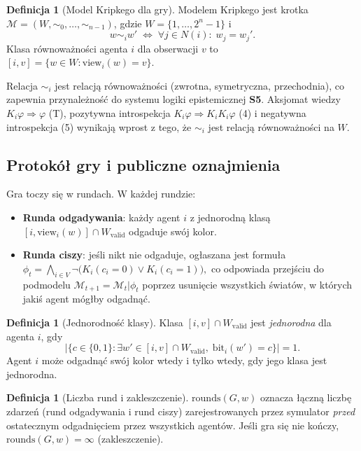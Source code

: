 \documentclass[12pt,a4paper]{article}
\theoremstyle{plain}
\theoremstyle{definition}
\newtheorem{definition}[theorem]{Definicja}
\theoremstyle{remark}
\newcommand{\rounds}{\mathrm{rounds}}
\newcommand{\view}{\mathrm{view}}
\newcommand{\Wval}{W_{\mathrm{valid}}}
\begin{document}
\begin{definition}[Model Kripkego dla gry]
Modelem Kripkego jest krotka $\mathcal{M} = (W, \sim_0, \ldots, \sim_{n-1})$, gdzie $W = \{1,\ldots,2^n{-}1\}$ i
$$w \sim_i w' \;\iff\; \forall j \in N(i):\; w_j = w_j'.$$
Klasa równoważności agenta $i$ dla obserwacji $v$ to $[i,v] = \{w \in W : \view_i(w) = v\}$.
\end{definition}

Relacja $\sim_i$ jest relacją równoważności (zwrotna, symetryczna, przechodnia), co zapewnia przynależność do systemu logiki epistemicznej \textbf{S5}. Aksjomat wiedzy $K_i\varphi \Rightarrow \varphi$ (T), pozytywna introspekcja $K_i\varphi \Rightarrow K_i K_i\varphi$ (4) i negatywna introspekcja (5) wynikają wprost z tego, że $\sim_i$ jest relacją równoważności na $W$.

\subsection{Protokół gry i publiczne oznajmienia}

Gra toczy się w rundach. W każdej rundzie:
\begin{itemize}
  \item \textbf{Runda odgadywania}: każdy agent $i$ z jednorodną klasą $[i, \view_i(w)] \cap \Wval$ odgaduje swój kolor.
  \item \textbf{Runda ciszy}: jeśli nikt nie odgaduje, ogłaszana jest formuła
  $\phi_t = \bigwedge_{i \in V} \neg\bigl(K_i(c_i=0) \vee K_i(c_i=1)\bigr),$
  co odpowiada przejściu do podmodelu $\mathcal{M}_{t+1} = \mathcal{M}_t|\phi_t$ poprzez usunięcie wszystkich światów, w których jakiś agent mógłby odgadnąć.
\end{itemize}

\begin{definition}[Jednorodność klasy]
Klasa $[i,v] \cap \Wval$ jest \emph{jednorodna} dla agenta $i$, gdy
$$\bigl|\{c \in \{0,1\} : \exists w' \in [i,v] \cap \Wval,\; \mathrm{bit}_i(w') = c\}\bigr| = 1.$$
Agent $i$ może odgadnąć swój kolor wtedy i tylko wtedy, gdy jego klasa jest jednorodna.
\end{definition}

\begin{definition}[Liczba rund i zakleszczenie]
$\rounds(G,w)$ oznacza łączną liczbę zdarzeń (rund odgadywania i rund ciszy) zarejestrowanych przez symulator \emph{przed} ostatecznym odgadnięciem przez wszystkich agentów. Jeśli gra się nie kończy, $\rounds(G,w) = \infty$ (zakleszczenie).
\end{definition}
\end{document}
